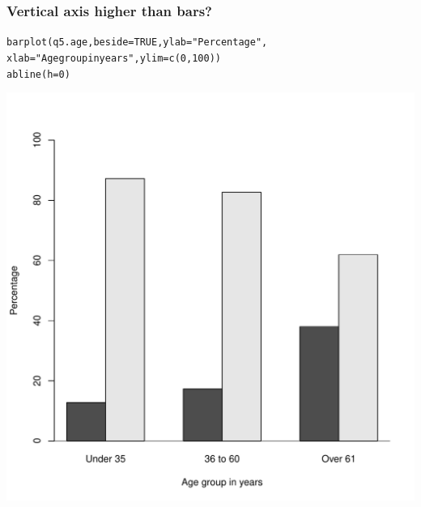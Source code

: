 \documentclass{beamer}\usepackage[]{graphicx}\usepackage[]{color}
\makeatletter
\newcommand{\hlnum}[1]{\textcolor[rgb]{0.533,0,0.133}{#1}}%
\newcommand{\hlstr}[1]{\textcolor[rgb]{0.667,0.267,0}{#1}}%
\newcommand{\hlstd}[1]{\textcolor[rgb]{0,0,0}{#1}}%
\newcommand{\hlkwc}[1]{\textcolor[rgb]{0,0,0.4}{#1}}%
\newcommand{\hlkwd}[1]{\textcolor[rgb]{0,0.267,0.4}{#1}}%
\newenvironment{kframe}{%
 \def\at@end@of@kframe{}%
 \ifinner\ifhmode%
  \def\at@end@of@kframe{\end{minipage}}%
  \begin{minipage}{\columnwidth}%
 \fi\fi%
 \def\FrameCommand##1{\hskip\@totalleftmargin \hskip-\fboxsep
 \colorbox{shadecolor}{##1}\hskip-\fboxsep
     \hskip-\linewidth \hskip-\@totalleftmargin \hskip\columnwidth}%
 \MakeFramed {\advance\hsize-\width
   \@totalleftmargin\z@ \linewidth\hsize
   \@setminipage}}%
 {\par\unskip\endMakeFramed%
 \at@end@of@kframe}
\newenvironment{knitrout}{}{} %
\makeatother
\begin{document}
\begin{frame}[fragile]
  \frametitle{Vertical axis higher than bars?}
\begin{knitrout}
\color{fgcolor}\begin{kframe}
\begin{alltt}
\hlkwd{barplot}\hlstd{(q5.age,} \hlkwc{beside} \hlstd{=} \hlnum{TRUE}\hlstd{,} \hlkwc{ylab} \hlstd{=} \hlstr{"Percentage"}\hlstd{,}
        \hlkwc{xlab} \hlstd{=} \hlstr{"Age group in years"}\hlstd{,} \hlkwc{ylim} \hlstd{=} \hlkwd{c}\hlstd{(}\hlnum{0}\hlstd{,} \hlnum{100}\hlstd{))}
\hlkwd{abline}\hlstd{(}\hlkwc{h} \hlstd{=} \hlnum{0}\hlstd{)}
\end{alltt}
\end{kframe}

{\centering \includegraphics[width=0.45\linewidth]{figure/bar11-1} 

}



\end{knitrout}
\end{frame}
\end{document}
